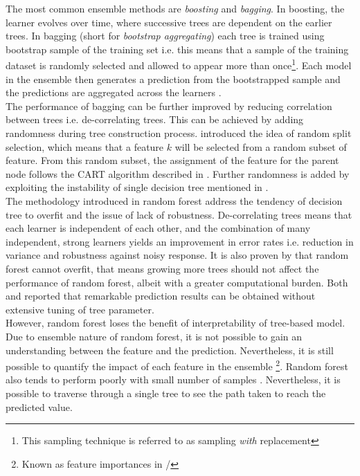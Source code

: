 The most common ensemble methods are \emph{boosting} and \emph{bagging}. In boosting, the learner evolves over time, where successive trees are dependent on the earlier trees. In bagging (short for \emph{bootstrap aggregating}) each tree is trained using bootstrap sample of the training set i.e. this means that a sample of the training dataset is randomly selected and allowed to appear more than once\footnote{This sampling technique is referred to as sampling \emph{with} replacement}. Each model in the ensemble then generates a prediction from the bootstrapped sample and the predictions are aggregated across the learners .\\

The performance of bagging can be further improved by reducing correlation between trees i.e. de-correlating trees. This can be achieved by adding randomness during tree construction process.  introduced the idea of random split selection, which means that a feature $k$ will be selected from a random subset of feature. From this random subset, the assignment of the feature for the parent node follows the CART algorithm described in . Further randomness is added by exploiting the instability of single decision tree mentioned in .\\

The methodology introduced in random forest address the tendency of decision tree to overfit and the issue of lack of robustness. De-correlating trees means that each learner is independent of each other, and the combination of many independent, strong learners yields an improvement in error rates i.e. reduction in variance and robustness against noisy response. It is also proven by  that random forest cannot overfit, that means growing more trees should not affect the performance of random forest, albeit with a greater computational burden. Both  and  reported that remarkable prediction results can be obtained without extensive tuning of tree parameter. \\

However, random forest loses the benefit of interpretability of tree-based model. Due to ensemble nature of random forest, it is not possible to gain an understanding between the feature and the prediction. Nevertheless, it is still possible to quantify the impact of each feature in the ensemble \footnote{Known as feature importances in \scikit/}. Random forest also tends to perform poorly with small number of samples . Nevertheless, it is possible to traverse through a single tree to see the path taken to reach the predicted value.\\

